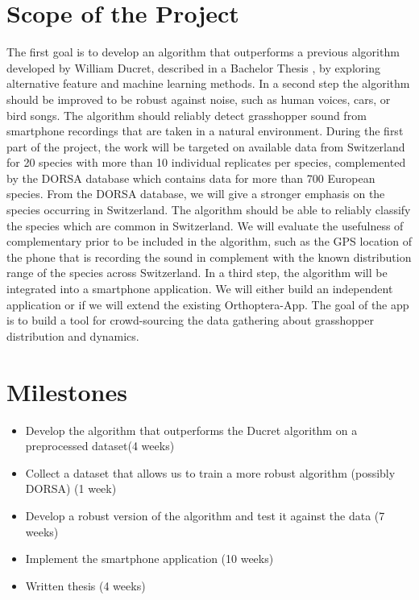\documentclass[paper=a4, fontsize=11pt]{scrartcl}
\begin{document}
\section*{Scope of the Project}

The first goal is to develop an algorithm that outperforms a previous algorithm developed by William Ducret, described in a Bachelor Thesis \cite{2015-ducret}, by exploring alternative feature and machine learning methods. In a second step the algorithm should be improved to be robust against noise, such as human voices, cars, or bird songs. The algorithm should reliably detect grasshopper sound from smartphone recordings that are taken in a natural environment. During the first part of the project, the work will be targeted on available data from Switzerland for 20 species with more than 10 individual replicates per species, complemented by the DORSA database \cite{DORSA} which contains data for more than 700 European species. From the DORSA database, we will give a stronger emphasis on the species occurring in Switzerland. The algorithm should be able to reliably classify the species which are common in Switzerland. We will evaluate the usefulness of complementary prior to be included in the algorithm, such as the GPS location of the phone that is recording the sound in complement with the known distribution range of the species across Switzerland. In a third step, the algorithm will be integrated into a smartphone application. We will either build an independent application or if we will extend the existing Orthoptera-App\cite{orthoapp}. The goal of the app is to build a tool for crowd-sourcing the data gathering about grasshopper distribution and dynamics.


\section*{Milestones}

\begin{itemize}
  	\item Develop the algorithm that outperforms the Ducret algorithm on a preprocessed dataset(4 weeks)
	\item Collect a dataset that allows us to train a more robust algorithm (possibly DORSA) (1 week)
	\item Develop a robust version of the algorithm and test it against the data (7 weeks)
  	\item Implement the smartphone application (10 weeks)
  	\item Written thesis (4 weeks)
\end{itemize}
\end{document}
